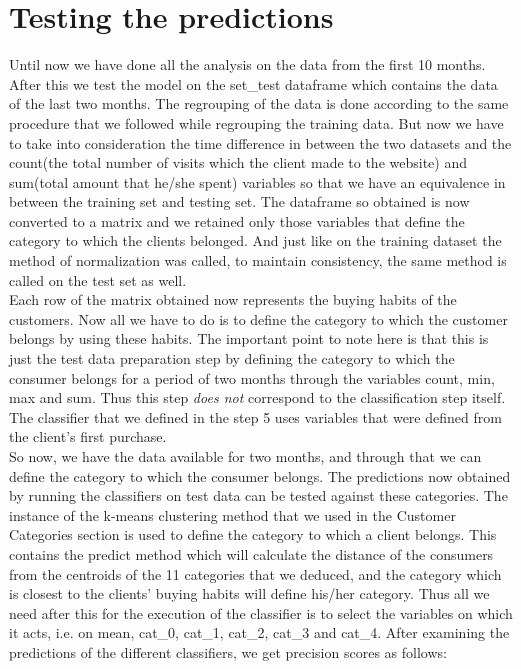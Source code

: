 \section{Testing the predictions}
Until now we have done all the analysis on the data from the first 10 months. After this we test the model on the set\_test dataframe which contains the data of the last two months. The regrouping of the data is done according to the same procedure that we followed while regrouping the training data. But now we have to take into consideration the time difference in between the two datasets and the count(the total number of visits which the client made to the website) and sum(total amount that he/she spent) variables so that we have an equivalence in between the training set and testing set. The dataframe so obtained is now converted to a matrix and we retained only those variables that define the category to which the clients belonged. And just like on the training dataset the method of normalization was called, to maintain consistency, the same method is called on the test set as well.\\
Each row of the matrix obtained now represents the buying habits of the customers. Now all we have to do is to define the category to which the customer belongs by using these habits. The important point to note here is that this is just the test data preparation step by defining the category to which the consumer belongs for a period of two months through the variables count, min, max and sum. Thus this step \emph{does not} correspond to the classification step itself. The classifier that we defined in the step 5 uses variables that were defined from the client's first purchase.\\
So now, we have the data available for two months, and through that we can define the category to which the consumer belongs. The predictions now obtained by running the classifiers on test data can be tested against these categories. The instance of the k-means clustering method that we used in the Customer Categories section is used to define the category to which a client belongs. This contains the predict method which will calculate the distance of the consumers from the centroids of the 11 categories that we deduced, and the category which is closest to the clients' buying habits will define his/her category. Thus all we need after this for the execution of the classifier is to select the variables on which it acts, i.e. on mean, cat\_0, cat\_1, cat\_2, cat\_3 and cat\_4. After examining the predictions of the different classifiers, we get precision scores as follows:\\ 

